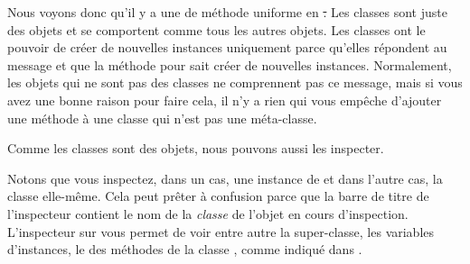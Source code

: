 \documentclass[a4paper,10pt,twoside]{book}
\begin{document}
Nous voyons donc qu'il y a une  de méthode uniforme en \st.
Les classes sont juste des objets et se comportent comme tous les autres objets.
Les classes ont le pouvoir de créer de nouvelles instances uniquement parce qu'elles répondent au message  et que la méthode pour  sait créer de nouvelles instances.
Normalement, les objets qui ne sont pas des classes ne comprennent pas
ce message, mais si vous avez une bonne raison pour faire cela, il n'y a rien qui vous empêche d'ajouter une méthode  à une classe qui n'est pas une méta-classe.

Comme les classes sont des objets, nous pouvons aussi les inspecter.


\noindent
Notons que vous inspectez, dans un cas, une instance de  et
dans l'autre cas, la classe  elle-même.
Cela peut prêter à confusion parce que la barre de titre de l'inspecteur contient le nom de la \emph{classe} de l'objet en cours d'inspection.
L'inspecteur sur  vous permet de voir 
entre autre la super-classe, les variables d'instances, le  des méthodes 
de  la classe , comme indiqué dans .
\end{document}
